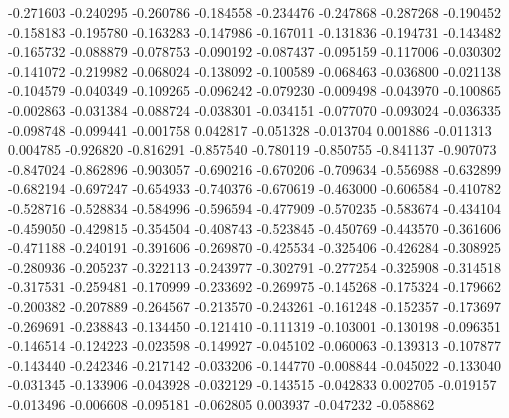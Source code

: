 -0.271603
-0.240295
-0.260786
-0.184558
-0.234476
-0.247868
-0.287268
-0.190452
-0.158183
-0.195780
-0.163283
-0.147986
-0.167011
-0.131836
-0.194731
-0.143482
-0.165732
-0.088879
-0.078753
-0.090192
-0.087437
-0.095159
-0.117006
-0.030302
-0.141072
-0.219982
-0.068024
-0.138092
-0.100589
-0.068463
-0.036800
-0.021138
-0.104579
-0.040349
-0.109265
-0.096242
-0.079230
-0.009498
-0.043970
-0.100865
-0.002863
-0.031384
-0.088724
-0.038301
-0.034151
-0.077070
-0.093024
-0.036335
-0.098748
-0.099441
-0.001758
0.042817
-0.051328
-0.013704
0.001886
-0.011313
0.004785
-0.926820
-0.816291
-0.857540
-0.780119
-0.850755
-0.841137
-0.907073
-0.847024
-0.862896
-0.903057
-0.690216
-0.670206
-0.709634
-0.556988
-0.632899
-0.682194
-0.697247
-0.654933
-0.740376
-0.670619
-0.463000
-0.606584
-0.410782
-0.528716
-0.528834
-0.584996
-0.596594
-0.477909
-0.570235
-0.583674
-0.434104
-0.459050
-0.429815
-0.354504
-0.408743
-0.523845
-0.450769
-0.443570
-0.361606
-0.471188
-0.240191
-0.391606
-0.269870
-0.425534
-0.325406
-0.426284
-0.308925
-0.280936
-0.205237
-0.322113
-0.243977
-0.302791
-0.277254
-0.325908
-0.314518
-0.317531
-0.259481
-0.170999
-0.233692
-0.269975
-0.145268
-0.175324
-0.179662
-0.200382
-0.207889
-0.264567
-0.213570
-0.243261
-0.161248
-0.152357
-0.173697
-0.269691
-0.238843
-0.134450
-0.121410
-0.111319
-0.103001
-0.130198
-0.096351
-0.146514
-0.124223
-0.023598
-0.149927
-0.045102
-0.060063
-0.139313
-0.107877
-0.143440
-0.242346
-0.217142
-0.033206
-0.144770
-0.008844
-0.045022
-0.133040
-0.031345
-0.133906
-0.043928
-0.032129
-0.143515
-0.042833
0.002705
-0.019157
-0.013496
-0.006608
-0.095181
-0.062805
0.003937
-0.047232
-0.058862
